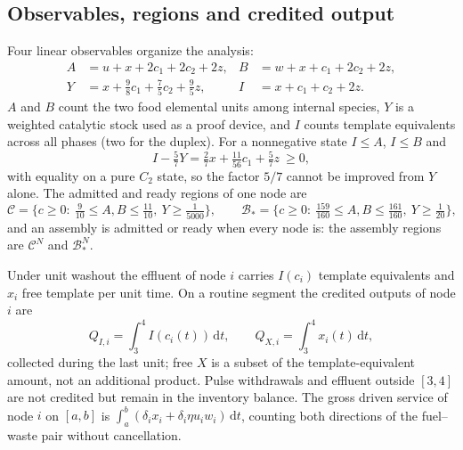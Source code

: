 \documentclass[11pt,a4paper]{article}
\theoremstyle{plain}
\theoremstyle{definition}
\theoremstyle{remark}
\newcommand{\dd}{\,\mathrm d}
\newcommand{\Adm}{\mathcal C}
\newcommand{\Bstar}{\mathcal B_*}
\newcommand{\Iv}{I}
\begin{document}
\subsection{Observables, regions and credited output}\label{sec:regions}
Four linear observables organize the analysis:
\begin{equation}\label{eq:observables}
\begin{aligned}
A&=u+x+2c_1+2c_2+2z,&B&=w+x+c_1+2c_2+2z,\\
Y&=x+\tfrac98c_1+\tfrac75c_2+\tfrac95z,&\Iv&=x+c_1+c_2+2z.
\end{aligned}
\end{equation}
$A$ and $B$ count the two food elemental units among internal species, $Y$ is a weighted catalytic stock used as a proof device, and $\Iv$ counts template equivalents across all phases (two for the duplex). For a nonnegative state $\Iv\le A$, $\Iv\le B$ and
\begin{equation}\label{eq:IY}
\Iv-\tfrac57Y=\tfrac27x+\tfrac{11}{56}c_1+\tfrac57z\ \ge0,
\end{equation}
with equality on a pure $C_2$ state, so the factor $5/7$ cannot be improved from $Y$ alone. The admitted and ready regions of one node are
\begin{equation}\label{eq:regions}
\Adm=\{c\ge0:\ \tfrac9{10}\le A,B\le\tfrac{11}{10},\ Y\ge\tfrac1{5000}\},\qquad
\Bstar=\{c\ge0:\ \tfrac{159}{160}\le A,B\le\tfrac{161}{160},\ Y\ge\tfrac1{20}\},
\end{equation}
and an assembly is admitted or ready when every node is: the assembly regions are $\Adm^N$ and $\Bstar^N$.

Under unit washout the effluent of node $i$ carries $\Iv(c_i)$ template equivalents and $x_i$ free template per unit time. On a routine segment the credited outputs of node $i$ are
\begin{equation}\label{eq:credited}
Q_{\Iv,i}=\int_3^4\Iv(c_i(t))\dd t,\qquad Q_{X,i}=\int_3^4x_i(t)\dd t,
\end{equation}
collected during the last unit; free $X$ is a subset of the template-equivalent amount, not an additional product. Pulse withdrawals and effluent outside $[3,4]$ are not credited but remain in the inventory balance. The gross driven service of node $i$ on $[a,b]$ is $\int_a^b(\delta_ix_i+\delta_i\eta u_iw_i)\dd t$, counting both directions of the fuel--waste pair without cancellation.
\end{document}
